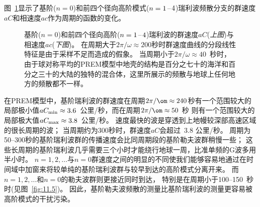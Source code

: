 图~\ref{fig:11.6}显示了基阶($n=0$)和前四个径向高阶模式($n=1\hspace{0.2 mm}$--$\hspace{0.2 mm}4$)瑞利波频散分支的群速度$aC$和相速度$ac$作为周期的函数的变化。
\begin{figure}[!t]
\begin{center}
\end{center}
\caption[Rayleigh speeds]{
\label{fig:11.6}
基阶($n=0$)和前四个径向高阶($n=1\hspace{0.2 mm}$--$\hspace{0.2 mm}4$)瑞利波的群速度$aC$({\em 上图\/})与相速度$ac$({\em 下图\/})。
在周期大于$2\pi/\omega\approx 200$秒时群速度曲线的分段线性特征是由于采样不足而造成的假象。
当周期小于$2\pi/\omega\approx 40$~秒时，由于球对称平均的PREM模型中地壳的结构是百分之七十的海洋和百分之三十的大陆的独特的混合体，这里所展示的频散与地球上任何地方的频散都不一样。
}
\end{figure}
在PREM模型中，基阶瑞利波的群速度在周期$2\pi/\om\approx 240$秒有一个范围较大的局部极小值$aC_{\rm min}\approx 3.6$~公里/秒，而在周期$2\pi/\om\approx 50$ 秒
则有一个范围较大的局部极大值$aC_{\rm max}\approx 3.8$~公里/秒。
速度最快的波是穿透到上地幔较深部高速区域的很长周期的波；
当周期约为300秒时，群速度$aC$会超过~3.8 公里/秒。
周期为50--300秒的基阶瑞利波群的传播速度会比同周期段的基阶勒夫波群稍慢一些；
这些长周期的基阶瑞利波几乎需要三个小时才能绕行地球一周，比准单频的G波多用半小时。
$n=1,2,\ldots$与$n=0$群速度之间的明显的不同使我们能够容易地通过在时间域中加窗来将较单纯的基阶瑞利波群与较早到达的高阶模式分离开来。
而$n=1,2,\ldots$和$n=0$的勒夫波群则更接近同时到达，
特别是在周期小于100--150~秒时(见图~\ref{fig:11.5})。
因此，基阶勒夫波频散的测量比基阶瑞利波的测量更容易被高阶模式的干扰污染。

